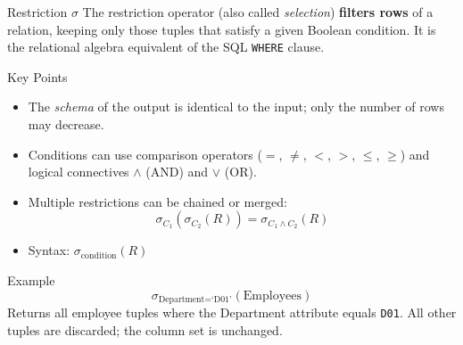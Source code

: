 \begin{frame}{Restriction $\sigma$}
  The restriction operator (also called \emph{selection}) \textbf{filters
  rows} of a relation, keeping only those tuples that satisfy a given
  Boolean condition.  It is the relational algebra equivalent of the SQL
  \texttt{WHERE} clause.

  \begin{block}{Key Points}
    \begin{itemize}
      \item The \emph{schema} of the output is identical to the input;
            only the number of rows may decrease.
      \item Conditions can use comparison operators
            ($=$, $\neq$, $<$, $>$, $\leq$, $\geq$) and logical
            connectives $\wedge$ (AND) and $\vee$ (OR).
      \item Multiple restrictions can be chained or merged:
            \[
              \sigma_{C_1}(\sigma_{C_2}(R)) = \sigma_{C_1 \wedge C_2}(R)
            \]
      \item Syntax: $\sigma_{\text{condition}}(R)$
    \end{itemize}
  \end{block}

  \begin{examples}{Example}
    \[
      \sigma_{\text{Department} = \text{`D01'}}(\text{Employees})
    \]
    Returns all employee tuples where the Department attribute equals
    \texttt{D01}.  All other tuples are discarded; the column set is
    unchanged.
  \end{examples}
\end{frame}

